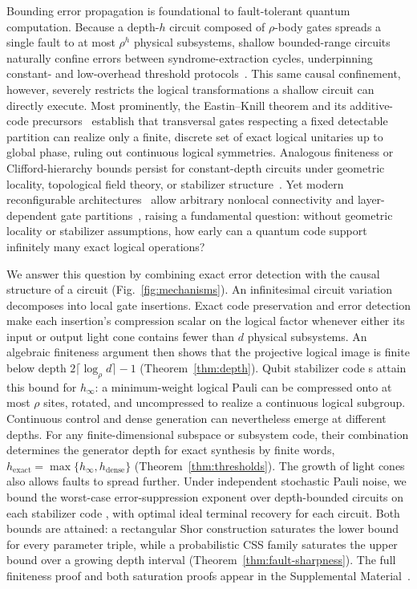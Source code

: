 \documentclass[aps,prl,reprint,notitlepage,nofootinbib,nobibnotes]{revtex4-2}
\begin{document}
Bounding error propagation is foundational to fault-tolerant quantum computation. Because a
depth-$h$ circuit composed of $\rho$-body gates spreads a single fault to at most $\rho^h$ physical
subsystems, shallow bounded-range circuits naturally confine errors between syndrome-extraction
cycles, underpinning constant- and low-overhead threshold protocols~\cite{Gottesman,BravyiMemory}.
This same causal confinement, however, severely restricts the logical transformations a shallow
circuit can directly execute. Most prominently, the Eastin--Knill theorem and its additive-code
precursors~\cite{Zeng,EK} establish that transversal gates respecting a fixed detectable partition
can realize only a finite, discrete set of exact logical unitaries up to global phase, ruling out
continuous logical symmetries. Analogous finiteness or Clifford-hierarchy bounds persist for
constant-depth circuits under geometric locality, topological field theory, or stabilizer
structure~\cite{BK,PY,Beverland,Anderson,JKY,Webster,LuFuLiu}. Yet modern reconfigurable
architectures~\cite{Bluvstein2024} allow arbitrary nonlocal connectivity and layer-dependent gate
partitions~\cite{Quintavalle,BreuckmannBurton}, raising a fundamental question: without geometric
locality or stabilizer assumptions, how early can a quantum code support infinitely many exact
logical operations?

We answer this question by combining exact error detection with the causal structure of a circuit
(Fig.~\ref{fig:mechanisms}). An infinitesimal circuit variation decomposes into local gate
insertions. Exact code preservation and error detection make each insertion's compression scalar on
the logical factor whenever either its input or output light cone contains fewer than $d$ physical
subsystems. An algebraic finiteness argument then shows that the projective logical image is finite
below depth $2\lceil\log_\rho d\rceil-1$ (Theorem~\ref{thm:depth}). Qubit stabilizer code s
attain this bound for $h_\infty$: a minimum-weight logical Pauli can be compressed onto at most
$\rho$ sites, rotated, and uncompressed to realize a continuous logical subgroup. Continuous
control and dense generation can nevertheless emerge at different depths. For any
finite-dimensional subspace or subsystem code, their combination determines the generator depth for
exact synthesis by finite words, $h_{\mathrm{exact}}=\max\{h_\infty,h_{\mathrm{dense}}\}$
(Theorem~\ref{thm:thresholds}). The growth of light cones also allows faults to spread further.
Under independent stochastic Pauli noise, we bound the worst-case error-suppression exponent over
depth-bounded circuits on each stabilizer code , with optimal ideal terminal recovery for
each circuit. Both bounds are attained: a rectangular Shor construction saturates the lower bound
for every parameter triple, while a probabilistic CSS family saturates the upper bound over a
growing depth interval (Theorem~\ref{thm:fault-sharpness}). The full finiteness proof and both
saturation proofs appear in the Supplemental Material~\cite{Supplement}.
\end{document}
